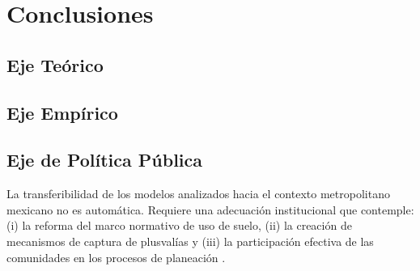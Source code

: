 
\section{Conclusiones}

\lipsum[12]

\subsection{Eje Teórico}

\lipsum[13]

\subsection{Eje Empírico}

\lipsum[14]

\subsection{Eje de Política Pública}

La transferibilidad de los modelos analizados hacia el contexto metropolitano mexicano no es automática.
Requiere una adecuación institucional que contemple: (i) la reforma del marco normativo de uso de suelo,
(ii) la creación de mecanismos de captura de plusvalías y (iii) la participación efectiva de las
comunidades en los procesos de planeación \cite{lore2024zmvm}.

\lipsum[15]
